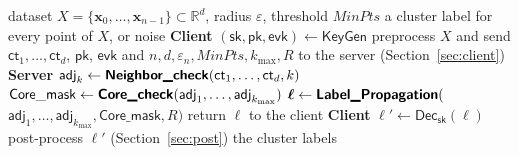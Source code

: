 

\begin{algorithm}[t]
\caption{\textsf{FHE-DBSCAN}}
\label{alg:protocol}
\begin{algorithmic}[1]
\Require dataset $X = \{\mathbf{x}_0, \dots, \mathbf{x}_{n-1}\}
  \subset \mathbb{R}^d$, radius $\varepsilon$, threshold
  $\mathit{MinPts}$
\Ensure a cluster label for every point of $X$, or noise
\Statex \textbf{Client}
\Indent
\State $(\mathsf{sk}, \mathsf{pk}, \mathsf{evk}) \gets \mathsf{KeyGen}$
\State preprocess $X$ and send $\mathsf{ct}_1, \dots, \mathsf{ct}_d$,
  $\mathsf{pk}$, $\mathsf{evk}$ and
  $n, d, \varepsilon_n, \mathit{MinPts}, k_{\max}, R$ to the server
  (Section~\ref{sec:client})
\EndIndent
\Statex \textbf{Server}
\Indent
{}
  \State $\mathsf{adj}_k \gets \textbf{\textsf{Neighbor\_check}}
    (\mathsf{ct}_1, \dots, \mathsf{ct}_d, k)$
\EndFor
\State $\mathsf{Core\_mask} \gets \textbf{\textsf{Core\_check}}
  (\mathsf{adj}_1, \dots, \mathsf{adj}_{k_{\max}})$
\State $\boldsymbol{\ell} \gets \textbf{\textsf{Label\_Propagation}}($
  \Statex \hspace{\algorithmicindent}\hspace{\algorithmicindent}
  $\mathsf{adj}_1, \dots, \mathsf{adj}_{k_{\max}},
   \mathsf{Core\_mask}, R)$
\State return $\boldsymbol{\ell}$ to the client
\EndIndent
\Statex \textbf{Client}
\Indent
\State $\boldsymbol{\ell}' \gets
  \mathsf{Dec}_{\mathsf{sk}}(\boldsymbol{\ell})$
\State post-process $\boldsymbol{\ell}'$ (Section~\ref{sec:post})
\State \Return the cluster labels
\EndIndent
\end{algorithmic}
\end{algorithm}